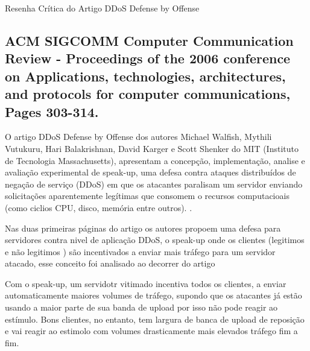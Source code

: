 \documentclass[a4paper,12pt]{article}
\begin{document}
\LARGE
Resenha Crítica do Artigo DDoS Defense by Offense
\large

\subsection*{\textbf{ACM SIGCOMM } Computer Communication Review - Proceedings of the 2006 conference on Applications, technologies, architectures, and protocols for computer communications, Pages 303-314. }

O artigo DDoS Defense by Offense dos autores Michael Walfish, Mythili Vutukuru, Hari Balakrishnan, David Karger  e  Scott Shenker do MIT (Instituto de Tecnologia Massachusetts), apresentam a concepção, implementação, analise e avaliação experimental de speak-up, uma defesa contra ataques distribuídos de negação de serviço (DDoS) em que os atacantes paralisam um servidor enviando solicitações aparentemente legítimas que consomem o recursos computacioais (como ciclios CPU, disco, memória entre outros).
.

Nas duas primeiras páginas do artigo os autores propoem uma defesa para servidores contra nivel de aplicação DDoS, o speak-up onde os clientes (legitimos e não legitimos ) são incentivados a enviar mais tráfego para um servidor atacado, esse conceito foi analisado ao decorrer do artigo

Com o speak-up, um servidotr vitimado incentiva todos os clientes, a  enviar automaticamente maiores volumes de tráfego, supondo que os atacantes já estão usando a maior parte de sua banda de upload por isso não pode reagir ao estímulo. Bons clientes, no entanto, tem largura de banca de upload de reposição e vai reagir ao estimolo com volumes drasticamente mais elevados tráfego fim a fim.\\


\begin{center}
\end{center}

 
\end{document}

